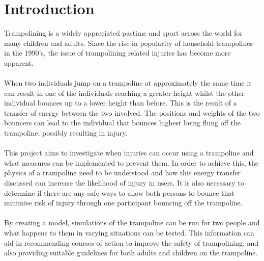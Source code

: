 \section{Introduction}

Trampolining is a widely appreciated pastime and sport across the world for many children and adults. Since the rise in popularity of household trampolines in the 1990's, the issue of trampolining related injuries has become more apparent. %
\\
\\
\noindent When two individuals jump on a trampoline at approximately the same time it can result in one of the individuals reaching a greater height whilst the other individual bounces up to a lower height than before. This is the result of a transfer of energy between the two involved. The positions and weights of the two bouncers can lead to the individual that bounces highest being flung off the trampoline, possibly resulting in injury. 
\\
\\
\noindent This project aims to investigate when injuries can occur using a trampoline and what measures can be implemented to prevent them. In order to achieve this, the physics of a trampoline need to be understood and how this energy transfer discussed can increase the likelihood of injury in users. It is also necessary to determine if there are any safe ways to allow both persons to bounce that minimise risk of injury through one participant bouncing off the trampoline.
\\
\\
By creating a model, simulations of the trampoline can be run for two people and what happens to them in varying situations can be tested. This information can aid in recommending courses of action to improve the safety of trampolining, and also providing suitable guidelines for both adults and children on the trampoline.
